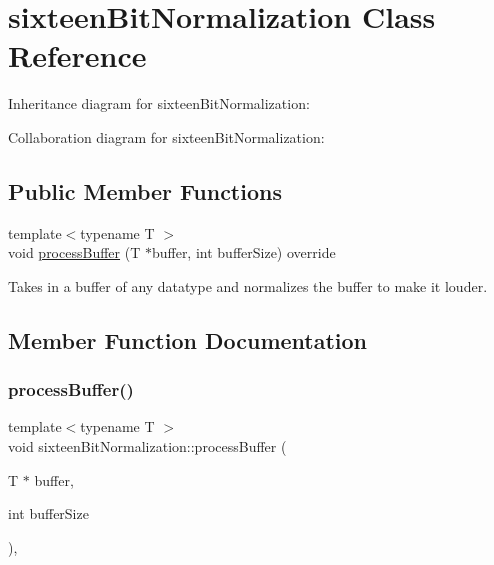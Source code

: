\hypertarget{classsixteenBitNormalization}{}\section{sixteen\+Bit\+Normalization Class Reference}
\label{classsixteenBitNormalization}


Inheritance diagram for sixteen\+Bit\+Normalization\+:


Collaboration diagram for sixteen\+Bit\+Normalization\+:
\subsection*{Public Member Functions}
\begin{DoxyCompactItemize}
\item 
{\footnotesize template$<$typename T $>$ }\\void \hyperlink{classsixteenBitNormalization_ac64ea3c298f3510451081f1e1770dca6}{process\+Buffer} (T $\ast$buffer, int buffer\+Size) override
\begin{DoxyCompactList}\small\item\em 
\begin{DoxyItemize}
\item Takes in a buffer of any datatype and normalizes the buffer to make it louder. 
\end{DoxyItemize}\end{DoxyCompactList}\end{DoxyCompactItemize}


\subsection{Member Function Documentation}
\mbox{\label{classsixteenBitNormalization_ac64ea3c298f3510451081f1e1770dca6}} 
\subsubsection{\texorpdfstring{process\+Buffer()}{processBuffer()}}
{\footnotesize\ttfamily template$<$typename T $>$ \\
void sixteen\+Bit\+Normalization\+::process\+Buffer (\begin{DoxyParamCaption}\item[{T $\ast$}]{buffer,  }\item[{int}]{buffer\+Size }\end{DoxyParamCaption})\hspace{0.3cm}{\ttfamily [inline]}, {\ttfamily [override]}}




